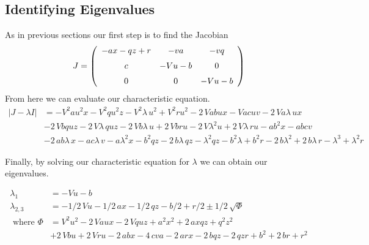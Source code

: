 \documentclass{article}
\begin{document}
\subsection{Identifying Eigenvalues}
As in previous sections our first step is to find the Jacobian
\begin{equation}
J = \left( \begin {array}{ccc} -ax-qz+r&-va&-vq\\ \noalign{\medskip}c&-Vu
-b&0\\ \noalign{\medskip}0&0&-Vu-b\end {array} \right) 
\end{equation}
From here we can evaluate our characteristic equation. 
\begin{equation}
	\begin{split}
		|J-\lambda I| &= -{V}^{2}a{u}^{2}x-{V}^{2}q{u}^{2}z-{V}^{2}\lambda\,{u}^{2}+{V}^{2}r{u}
		^{2}-2\,Vabux-Vacuv-2\,Va\lambda\,ux \\
		&-2\,Vbquz-2\,V\lambda\,quz-2\,Vb
		\lambda\,u+2\,Vbru-2\,V{\lambda}^{2}u+2\,V\lambda\,ru-a{b}^{2}x-abcv \\
		&-2\,ab\lambda\,x-ac\lambda\,v-a{\lambda}^{2}x-{b}^{2}qz-2\,b\lambda\,qz-
		{\lambda}^{2}qz-{b}^{2}\lambda+{b}^{2}r-2\,b{\lambda}^{2}+2\,b\lambda
		\,r-{\lambda}^{3}+{\lambda}^{2}r			
	\end{split}
\end{equation}


Finally, by solving our characteristic equation for $\lambda$ we can obtain our eigenvalues.

\begin{equation}
	\begin{split}
		\lambda_1 &= -Vu-b \\
		\lambda_{2,3} &= -1/2\,Vu-1/2\,ax-1/2\,qz-b/2+r/2 \pm 1/2\,\sqrt {\Phi}	\\
		\text{ where } \Phi  &= {V}^{2}{u}^{2}-2\,Vaux-2
		\,Vquz+{a}^{2}{x}^{2}+2\,axqz+{q}^{2}{z}^{2} \\
		&+2\,Vbu+2\,Vru-2\,abx-4\,c
		va-2\,arx-2\,bqz-2\,qzr+{b}^{2}+2\,br+{r}^{2}		
	\end{split}
\end{equation}
\end{document}
